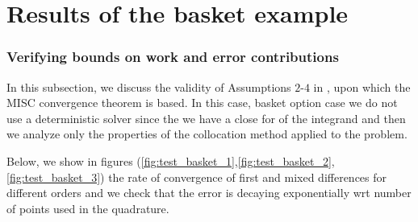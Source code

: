 \documentclass[11pt]{article}
\begin{document}
\newpage 
\section{Results of the basket example}
\subsubsection{Verifying bounds on work and error contributions}

In this subsection, we discuss the validity of Assumptions $2$-$4$ in \cite{haji2016multi}, upon which the MISC convergence theorem is based. In this case, basket option case we do not use a deterministic solver since the we have a close for of the integrand and then  we analyze  only the properties of the collocation method applied to
the problem.




Below, we show in figures (\ref{fig:test_basket_1},\ref{fig:test_basket_2},\ref{fig:test_basket_3}) the rate of convergence of first and mixed differences for different orders and we check that the error is decaying exponentially wrt number of points used in the quadrature.
\end{document}
